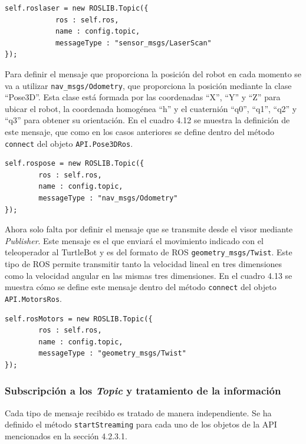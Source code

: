 \begin{lstlisting}[caption= Definición del mensaje para obtener la información del sensor láser, label=cod.mensajelaserturtle]
self.roslaser = new ROSLIB.Topic({
            ros : self.ros,
            name : config.topic,
            messageType : "sensor_msgs/LaserScan"
});
\end{lstlisting}

Para definir el mensaje que proporciona la posición del robot en cada momento se va a utilizar \texttt{nav\_msgs/Odometry}, que proporciona la posición mediante la clase ``Pose3D''. Esta clase está formada por las coordenadas ``X'', ``Y'' y ``Z'' para ubicar el robot, la coordenada homogénea ``h'' y el cuaternión ``q0'', ``q1'', ``q2'' y ``q3''  para obtener su orientación. En el cuadro 4.12 se muestra la definición de este mensaje, que como en los casos anteriores se define dentro del método \texttt{connect} del objeto \texttt{API.Pose3DRos}.

\begin{lstlisting}[caption= Definición del mensaje para obtener el posicionamiento del TurtleBot, label=cod.mensajeposeturtle]
self.rospose = new ROSLIB.Topic({
		ros : self.ros,
		name : config.topic,
		messageType : "nav_msgs/Odometry"
});
\end{lstlisting}

Ahora solo falta por definir el mensaje que se transmite desde el visor mediante \textit{Publisher}. Este mensaje es el que enviará el movimiento indicado con el teleoperador al TurtleBot y es del formato de ROS \texttt{geometry\_msgs/Twist}. Este tipo de ROS permite transmitir tanto la velocidad lineal en tres dimensiones como la velocidad angular en las mismas tres dimensiones. En el cuadro 4.13 se muestra cómo se define este mensaje dentro del método \texttt{connect} del objeto \texttt{API.MotorsRos}.

\begin{lstlisting}[caption= Definición del mensaje para transmitir el movimiento proporcionado por el teleoperador, label=cod.mensajemotorturtle]
self.rosMotors = new ROSLIB.Topic({
		ros : self.ros,
		name : config.topic,
		messageType : "geometry_msgs/Twist"
});
\end{lstlisting}

\subsubsection{Subscripción a los \textit{Topic} y tratamiento de la información}
Cada tipo de mensaje recibido es tratado de manera independiente. Se ha definido el método \texttt{startStreaming} para cada uno de los objetos de la API mencionados en la sección 4.2.3.1.

